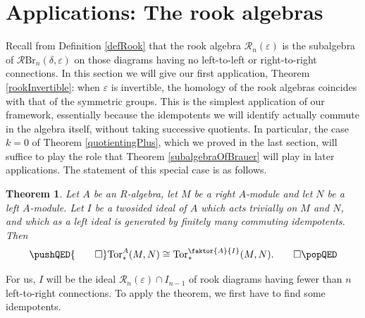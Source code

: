 \documentclass[12pt]{amsart}
\theoremstyle{plain}
\newtheorem{theorem}{Theorem}[section]
\theoremstyle{definition} \newtheorem{definition}[theorem]{Definition}
\theoremstyle{plain}
\theoremstyle{plain} \newtheorem{proposition}[theorem]{Proposition}
\theoremstyle{plain} \newtheorem{conjecture}[theorem]{Conjecture}
\theoremstyle{plain} \newtheorem{corollary}[theorem]{Corollary}
\theoremstyle{remark} \newtheorem{claim}[theorem]{Claim}
\theoremstyle{remark} \newtheorem{remark}[theorem]{Remark}
\theoremstyle{remark} \newtheorem{example}[theorem]{Example}
\theoremstyle{remark} \newtheorem{comment}[theorem]{Comment}
\theoremstyle{definition} \newtheorem{question}[theorem]{Question}
\newcommand{\rook}{\mathcal{R}}
\newcommand{\Tor}{\mathrm{Tor}}
\newcommand{\Brauer}{\mathrm{Br}}
\begin{document}
\section{Applications: The rook algebras} \label{sectionRook}

Recall from Definition \ref{defRook} that the rook algebra $\rook_n(\varepsilon)$ is the subalgebra of $\rook \Brauer_n(\delta, \varepsilon)$ on those diagrams having no left-to-left or right-to-right connections. In this section we will give our first application, Theorem \ref{rookInvertible}: when $\varepsilon$ is invertible, the homology of the rook algebras coincides with that of the symmetric groups. This is the simplest application of our framework, essentially because the idempotents we will identify actually commute in the algebra itself, without taking successive quotients. In particular, the case $k=0$ of Theorem \ref{quotientingPlus}, which we proved in the last section, will suffice to play the role that Theorem \ref{subalgebraOfBrauer} will play in later applications. The statement of this special case is as follows.

\begin{theorem} \label{quotienting} Let $A$ be an $R$-algebra, let $M$ be a right $A$-module and let $N$ be a left $A$-module. Let $I$ be a twosided ideal of $A$ which acts trivially on $M$ and $N$, and which as a left ideal is generated by finitely many commuting idempotents. Then \[\pushQED{\qed} 
\Tor^A_*(M,N) \cong \Tor^{\faktor{A}{I}}_*(M,N). \qedhere
\popQED
\] \end{theorem}

For us, $I$ will be the ideal $\rook_n(\varepsilon) \cap I_{n-1}$ of rook diagrams having fewer than $n$ left-to-right connections. To apply the theorem, we first have to find some idempotents.
\end{document}
